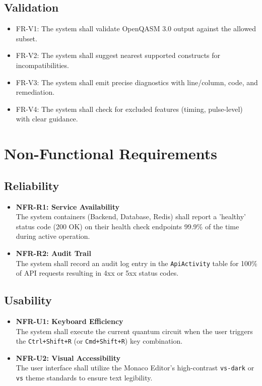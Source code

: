 \subsection{Validation}
\begin{itemize}
    \item FR-V1: The system shall validate OpenQASM 3.0 output against the allowed subset.
    \item FR-V2: The system shall suggest nearest supported constructs for incompatibilities.
    \item FR-V3: The system shall emit precise diagnostics with line/column, code, and remediation.
    \item FR-V4: The system shall check for excluded features (timing, pulse-level) with clear guidance.
\end{itemize}

\section{Non-Functional Requirements}

\subsection{Reliability}
\begin{itemize}
    \item \textbf{NFR-R1: Service Availability} \\
    The system containers (Backend, Database, Redis) shall report a 'healthy' status code (200 OK) on their health check endpoints 99.9\% of the time during active operation.
    \item \textbf{NFR-R2: Audit Trail} \\
    The system shall record an audit log entry in the \texttt{ApiActivity} table for 100\% of API requests resulting in 4xx or 5xx status codes.
\end{itemize}

\subsection{Usability}
\begin{itemize}
    \item \textbf{NFR-U1: Keyboard Efficiency} \\
    The system shall execute the current quantum circuit when the user triggers the \texttt{Ctrl+Shift+R} (or \texttt{Cmd+Shift+R}) key combination.
    \item \textbf{NFR-U2: Visual Accessibility} \\
    The user interface shall utilize the Monaco Editor's high-contrast \texttt{vs-dark} or \texttt{vs} theme standards to ensure text legibility.
\end{itemize}

